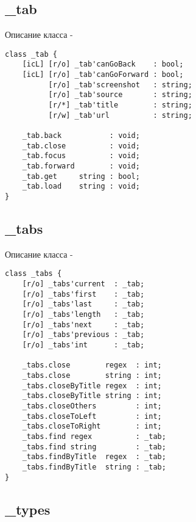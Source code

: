 \subsection{{\color{orange} \_tab}}

\noindent Описание класса  -
\begin{lstlisting}[numbers=none]
class _tab {
	[icL] [r/o] _tab'canGoBack    : bool;
	[icL] [r/o] _tab'canGoForward : bool;
	      [r/o] _tab'screenshot   : string;
	      [r/o] _tab'source       : string;
	      [r/*] _tab'title        : string;
	      [r/w] _tab'url          : string;

	_tab.back           : void;
	_tab.close          : void;
	_tab.focus          : void;
	_tab.forward        : void;
	_tab.get     string : bool;
	_tab.load    string : void;
}
\end{lstlisting}

\subsection{{\color{orange} \_tabs}}

\noindent Описание класса  -
\begin{lstlisting}[numbers=none]
class _tabs {
	[r/o] _tabs'current  : _tab;
	[r/o] _tabs'first    : _tab;
	[r/o] _tabs'last     : _tab;
	[r/o] _tabs'length   : _tab;
	[r/o] _tabs'next     : _tab;
	[r/o] _tabs'previous : _tab;
	[r/o] _tabs'int      : _tab;
	
	_tabs.close        regex  : int;
	_tabs.close        string : int;
	_tabs.closeByTitle regex  : int;
	_tabs.closeByTitle string : int;
	_tabs.closeOthers         : int;
	_tabs.closeToLeft         : int;
	_tabs.closeToRight        : int;
	_tabs.find regex          : _tab;
	_tabs.find string         : _tab;
	_tabs.findByTitle  regex  : _tab;
	_tabs.findByTitle  string : _tab;
}
\end{lstlisting}

\subsection{{\color{orange} \_types}}

